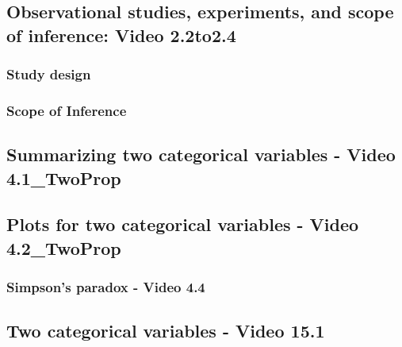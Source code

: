 \documentclass[
]{report}
\begin{document}
\subsection*{Observational studies, experiments, and scope of inference: Video 2.2to2.4}\label{observational-studies-experiments-and-scope-of-inference-video-2.2to2.4}

\subsubsection*{Study design}\label{study-design-1}

\subsubsection*{Scope of Inference}\label{scope-of-inference-1}

\subsection*{Summarizing two categorical variables - Video 4.1\_TwoProp}\label{summarizing-two-categorical-variables---video-4.1_twoprop}

\subsection*{Plots for two categorical variables - Video 4.2\_TwoProp}\label{plots-for-two-categorical-variables---video-4.2_twoprop}

\subsubsection*{Simpson's paradox - Video 4.4}\label{simpsons-paradox---video-4.4}

\subsection*{Two categorical variables - Video 15.1}\label{two-categorical-variables---video-15.1}
\end{document}
